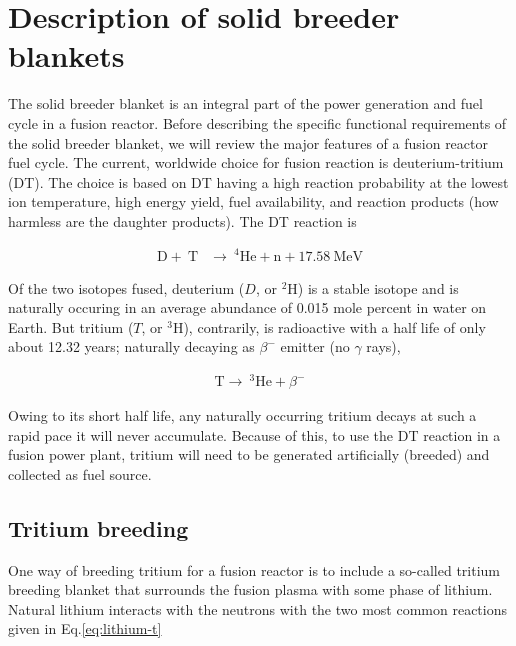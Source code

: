 \section{Description of solid breeder blankets}\label{sec:intro-blanket-description}

The solid breeder blanket is an integral part of the power generation and fuel cycle in a fusion reactor. Before describing the specific functional requirements of the solid breeder blanket, we will review the major features of a fusion reactor fuel cycle. The current, worldwide choice for fusion reaction is deuterium-tritium (DT). The choice is based on DT having a high reaction probability at the lowest ion temperature, high energy yield, fuel availability, and reaction products (how harmless are the daughter products). The DT reaction is

\begin{align}
	\mathrm{D} +~\mathrm{T}&\xrightarrow{}~^4\mathrm{He}+\mathrm{n}+17.58~\text{MeV} \label{eq:dt-reaction}
\end{align}

Of the two isotopes fused, deuterium ($D$, or $^2$H) is a stable isotope and is naturally occuring in an average abundance of 0.015 mole percent in water on Earth. But tritium ($T$, or $^3$H), contrarily, is radioactive with a half life of only about 12.32 years; naturally decaying as $\beta^-$ emitter (no $\gamma$ rays),

\begin{align}\label{eq:t-decay}
	\mathrm{T} \xrightarrow{}~^3\mathrm{He} + \beta^-
\end{align}

Owing to its short half life, any naturally occurring tritium decays at such a rapid pace it will never accumulate. Because of this, to use the DT reaction in a fusion power plant, tritium will need to be generated artificially (breeded) and collected as fuel source. 



\subsection{Tritium breeding}

One way of breeding tritium for a fusion reactor is to include a so-called tritium breeding blanket that surrounds the fusion plasma with some phase of lithium. Natural lithium interacts with the neutrons with the two most common reactions given in Eq.\ref{eq:lithium-t}

